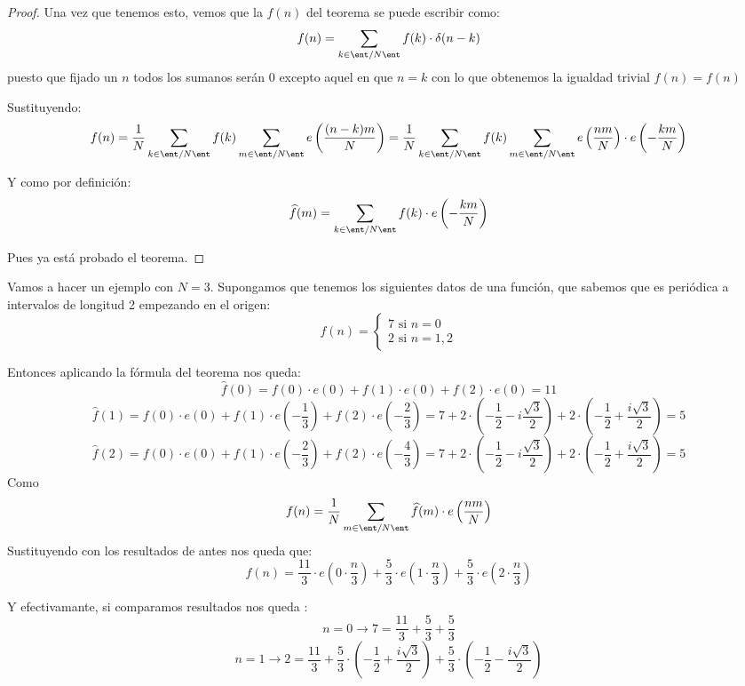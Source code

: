 \begin{proof}

	Una vez que tenemos esto, vemos que la $f(n)$ del teorema se puede escribir como:
	$$f(n) = \sum_{k\in \ent/N\ent} f(k) \cdot \delta(n-k)$$
	puesto que fijado un $n$ todos los sumanos serán 0 excepto aquel en que $n=k$ con lo que obtenemos la igualdad trivial $f(n)=f(n)$

	Sustituyendo:
	$$f(n) =\frac{1}{N} \sum_{k\in \ent/N\ent} f(k)  \sum_{m \in \ent/N\ent} e\left(\frac{(n-k)m}{N}\right) =  \frac{1}{N} \sum_{k\in \ent/N\ent} f(k)  \sum_{m \in \ent/N\ent} e\left(\frac{nm}{N}\right) \cdot e\left(- \frac{km}{N}\right)$$

	Y como por definición:
	$$\widehat{f}(m) = \sum_{k\in \ent/N\ent} f(k) \cdot e\left(- \frac{km}{N}\right)$$

	Pues ya está probado el teorema.
\end{proof}
\begin{example}
	Vamos a hacer un ejemplo con $N=3$. Supongamos que tenemos los siguientes datos de una función, que sabemos que es periódica a intervalos de longitud 2 empezando en el origen:
	$$f(n) = \begin{cases}
	7 \text{ si } n= 0\\
	2 \text{ si } n = 1 , 2
	\end{cases}$$

	Entonces aplicando la fórmula del teorema nos queda:
	$$\widehat{f}(0) = f(0)\cdot e(0) + f(1)\cdot e(0) + f(2) \cdot e(0) =  11$$
	$$\widehat{f}(1) = f(0)\cdot e(0) + f(1)\cdot e\left(-\frac{1}{3}\right) + f(2)\cdot e\left(-\frac{2}{3}\right) = 7 + 2\cdot\left(-\frac{1}{2} -i\frac{\sqrt{3}}{2}\right) + 2\cdot \left(-\frac{1}{2} + \frac{i\sqrt{3}}{2}\right) = 5$$
	$$\widehat{f}(2) = f(0)\cdot e(0) + f(1)\cdot e\left(- \frac{2}{3}\right) + f(2) \cdot e\left(-\frac{4}{3}\right) = 7 + 2\cdot\left(-\frac{1}{2} -i\frac{\sqrt{3}}{2}\right) + 2\cdot \left(-\frac{1}{2} + \frac{i\sqrt{3}}{2}\right) = 5$$
	Como
	$$f(n) = \frac{1}{N} \sum_{m\in \ent/ N\ent} \widehat{f}(m) \cdot e\left(\frac{nm}{N}\right)$$
	Sustituyendo con los resultados de antes nos queda que:
	$$f(n) = \frac{11}{3}\cdot e\left(0 \cdot \frac{n}{3}\right) + \frac{5}{3}\cdot e\left(1 \cdot \frac{n}{3}\right) + \frac{5}{3} \cdot e\left(2 \cdot \frac{n}{3}\right)$$

	Y efectivamante, si comparamos resultados nos queda :
	$$n = 0 \rightarrow 7 = \frac{11}{3} + \frac{5}{3} + \frac{5}{3}$$
	$$n = 1 \rightarrow 2 = \frac{11}{3} + \frac{5}{3} \cdot \left(- \frac{1}{2} + \frac{i \sqrt{3}}{2}\right) + \frac{5}{3} \cdot \left(- \frac{1}{2} -\frac{i \sqrt{3}}{2}\right)$$
\end{example}

